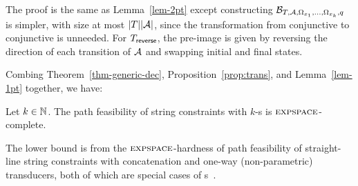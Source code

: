 The proof is the same as Lemma~\ref{lem-2pt} except constructing $\mathcal{B}_{T, \mathcal{A}, \Omega_{x_1}, \ldots, \Omega_{x_k}, q}$ is simpler, with size at most $|T| |\mathcal{A}|$, since the transformation from  conjunctive \FFA{} to conjunctive \FA{} is unneeded. For $T_{\sf reverse}$, the pre-image is given by reversing the direction of each transition of $\mathcal{A}$ and swapping initial and final states.   

Combing Theorem~\ref{thm-generic-dec}, Proposition~\ref{prop:trans}, and Lemma~\ref{lem-1pt} together, we have:

\begin{theorem} \label{thm-rb-2pt}
Let  $k \in \mathbb{N}$. The path feasibility of string constraints with $k$-\RBPPT{}s is $\textsc{expspace}$-complete. 
\end{theorem}

The lower bound is from the $\textsc{expspace}$-hardness of path feasibility of straight-line string constraints with concatenation and one-way (non-parametric) transducers,  both of which are special cases of \PT{}s~\cite{LB16}.
